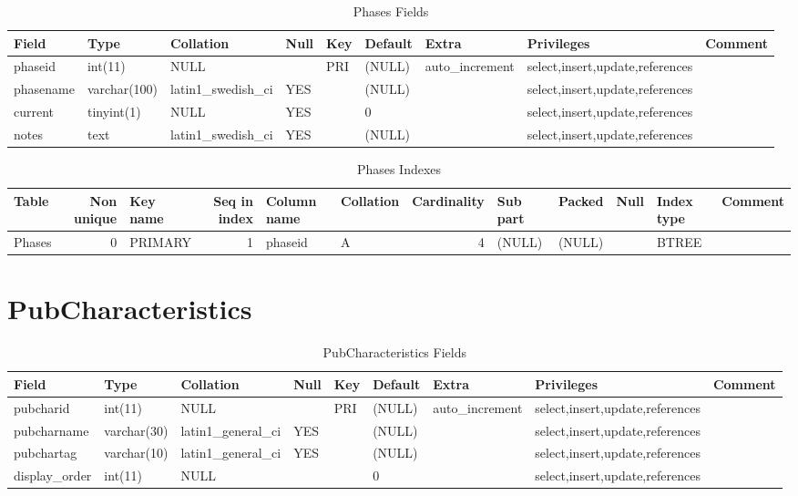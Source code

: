 \documentclass[captions=tablesignature]{scrartcl}
\begin{document}
\begin{table}[htb]
\caption{\label{tbl:phasesfields}Phases Fields}
\centering
\begin{tabular}{lllllllll}
\hline
Field & Type & Collation & Null & Key & Default & Extra & Privileges & Comment\\
\hline
phaseid & int(11) & NULL &  & PRI & (NULL) & auto\_increment & select,insert,update,references & \\
phasename & varchar(100) & latin1\_swedish\_ci & YES &  & (NULL) &  & select,insert,update,references & \\
current & tinyint(1) & NULL & YES &  & 0 &  & select,insert,update,references & \\
notes & text & latin1\_swedish\_ci & YES &  & (NULL) &  & select,insert,update,references & \\
\hline
\end{tabular}
\end{table}

\begin{table}[htb]
\caption{\label{tbl:phasesindexes}Phases Indexes}
\centering
\begin{tabular}{lrlrllrlllll}
\hline
Table & Non unique & Key name & Seq in index & Column name & Collation & Cardinality & Sub part & Packed & Null & Index type & Comment\\
\hline
Phases & 0 & PRIMARY & 1 & phaseid & A & 4 & (NULL) & (NULL) &  & BTREE & \\
\hline
\end{tabular}
\end{table}
\section{PubCharacteristics}
\label{sec-17}

\begin{table}[htb]
\caption{\label{tbl:pubcharacteristicsfields}PubCharacteristics Fields}
\centering
\begin{tabular}{lllllllll}
\hline
Field & Type & Collation & Null & Key & Default & Extra & Privileges & Comment\\
\hline
pubcharid & int(11) & NULL &  & PRI & (NULL) & auto\_increment & select,insert,update,references & \\
pubcharname & varchar(30) & latin1\_general\_ci & YES &  & (NULL) &  & select,insert,update,references & \\
pubchartag & varchar(10) & latin1\_general\_ci & YES &  & (NULL) &  & select,insert,update,references & \\
display\_order & int(11) & NULL &  &  & 0 &  & select,insert,update,references & \\
\hline
\end{tabular}
\end{table}
\end{document}
